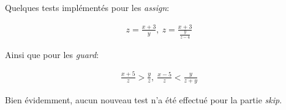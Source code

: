 Quelques tests implémentés pour les \textit{assign}:

\begin{equation*}
  \begin{aligned}
    z = \frac{x + 3}{y},\ z = \frac{x + 3}{\frac{y}{z - 4}}
  \end{aligned}
\end{equation*}

Ainsi que pour les \textit{guard}:

\begin{equation*}
  \begin{aligned}
    \frac{x + 5}{z} > \frac{y}{z},\ \frac{x - 5}{z} < \frac{y}{z + y}
  \end{aligned}
\end{equation*}

Bien évidemment, aucun nouveau test n'a été effectué pour la partie \textit{skip}.
